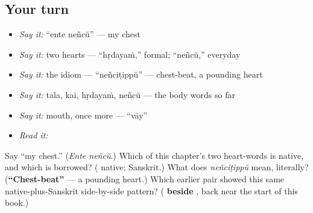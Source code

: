 \subsection*{Your turn}
\begin{itemize}
\raggedright
  \item \emph{Say it:} \textquotedblleft{}ente neñcŭ\textquotedblright{} — my chest
  \item \emph{Say it:} two hearts — \textquotedblleft{}hṛdayaṁ,\textquotedblright{} formal; \textquotedblleft{}neñcŭ,\textquotedblright{} everyday
  \item \emph{Say it:} the idiom — \textquotedblleft{}neñciṭippŭ\textquotedblright{} — chest-beat, a pounding heart
  \item \emph{Say it:} tala, kai, hṛdayaṁ, neñcŭ — the body words so far
  \item \emph{Say it:} mouth, once more — \textquotedblleft{}vāy\textquotedblright{}
  \item \emph{Read it:} \textbf{}
\end{itemize}

\begin{tcolorbox}[breakable,colback=teal!4,colframe=teal!35!black,title={Before you move on}]
Say \textquotedblleft{}my chest.\textquotedblright{} (\emph{Ente neñcŭ}.) Which of this chapter's two heart-words is native, and which is borrowed? (\textbf{} native; \textbf{} Sanskrit.) What does \emph{neñciṭippŭ} mean, literally? (\textbf{\textquotedblleft{}Chest-beat\textquotedblright{}} — a pounding heart.) Which earlier pair showed this same native-plus-Sanskrit side-by-side pattern? (\textbf{ beside }, back near the start of this book.)
\end{tcolorbox}

